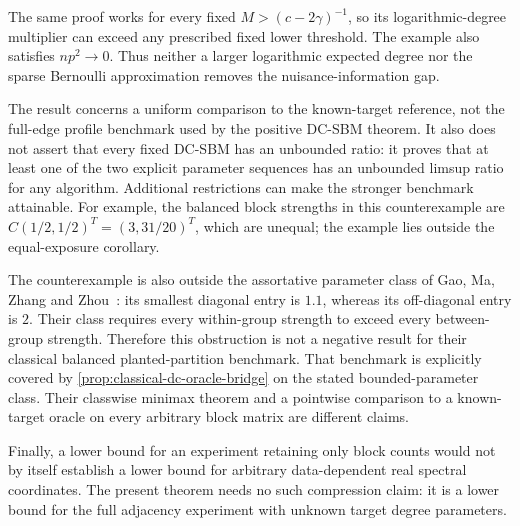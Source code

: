 \begin{remark}
\label{rem:imposs-scope}
The same proof works for every fixed
\(M>(c-2\gamma)^{-1}\), so its logarithmic-degree multiplier can exceed
any prescribed fixed lower threshold. The example also satisfies
\(np^2\to0\). Thus neither a larger logarithmic expected degree nor the
sparse Bernoulli approximation removes the nuisance-information gap.

The result concerns a uniform comparison to the known-target reference,
not the full-edge profile benchmark used by the positive DC-SBM theorem.
It also does not assert that every fixed DC-SBM has an unbounded ratio:
it proves that at least one of the two explicit parameter sequences has
an unbounded limsup ratio for any algorithm. Additional restrictions can
make the stronger benchmark attainable. For example, the balanced block
strengths in this counterexample are
\(C(1/2,1/2)^T=(3,31/20)^T\), which are unequal; the example lies outside
the equal-exposure corollary.

The counterexample is also outside the assortative parameter class of
Gao, Ma, Zhang and Zhou~\cite{gmzz2018}: its smallest diagonal entry is
$1.1$, whereas its off-diagonal entry is $2$. Their class requires every
within-group strength to exceed every between-group strength. Therefore
this obstruction is not a negative result for their classical balanced
planted-partition benchmark. That benchmark is explicitly covered by
\cref{prop:classical-dc-oracle-bridge} on the stated bounded-parameter
class. Their classwise minimax theorem and a pointwise comparison to a
known-target oracle on every arbitrary block matrix are different claims.

Finally, a lower bound for an experiment retaining only block counts would
not by itself establish a lower bound for arbitrary data-dependent real
spectral coordinates. The present theorem needs no such compression claim:
it is a lower bound for the full adjacency experiment with unknown target
degree parameters.
\end{remark}
